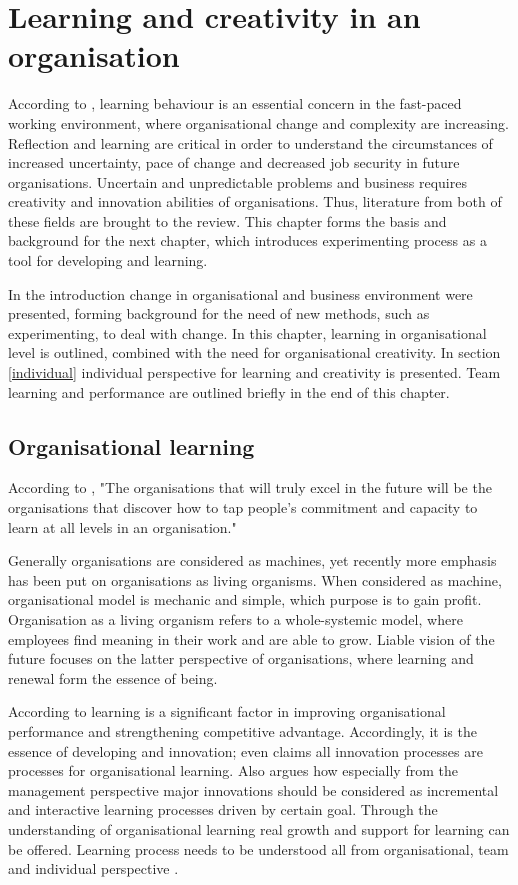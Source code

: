 \chapter{Learning and creativity in an organisation}
According to \citet{edmondson1999psychological}, learning behaviour is an essential concern in the fast-paced working environment, where organisational change and complexity are increasing. Reflection and learning are critical in order to understand the circumstances of increased uncertainty, pace of change and decreased job security in future organisations. Uncertain and unpredictable problems and business requires creativity and innovation abilities of organisations. Thus, literature from both of these fields are brought to the review. This chapter forms the basis and background for the next chapter, which introduces experimenting process as a tool for developing and learning. 

In the introduction change in organisational and business environment were presented, forming background for the need of new methods, such as experimenting, to deal with change. In this chapter, learning in organisational level is outlined, combined with the need for organisational creativity. In section \ref{individual} individual perspective for learning and creativity is presented. Team learning and performance are outlined briefly in the end of this chapter. 

\section{Organisational learning}
According to \citet{senge1990fifth}, "The organisations that will truly excel in the future will be the organisations that discover how to tap people's commitment and capacity to learn at all levels in an organisation."

Generally organisations are considered as machines, yet recently more emphasis has been put on organisations as living organisms. When considered as machine, organisational model is mechanic and simple, which purpose is to gain profit. Organisation as a living organism refers to a whole-systemic model, where employees find meaning in their work and are able to grow. Liable vision of the future focuses on the latter perspective of organisations, where learning and renewal form the essence of being. \citep{geus1997living}

According to \citet{march1991exploration} learning is a significant factor in improving organisational performance and strengthening competitive advantage. Accordingly, it is the essence of developing and innovation; \citet{buijs2007innovation} even claims all innovation processes are processes for organisational learning. Also \citep{quinn1985managing} argues how especially from the management perspective major innovations should be considered as incremental and interactive learning processes driven by certain goal. Through the understanding of organisational learning real growth and support for learning can be offered. Learning process needs to be understood all from organisational, team and individual perspective \citep{buijs2007innovation}. 

